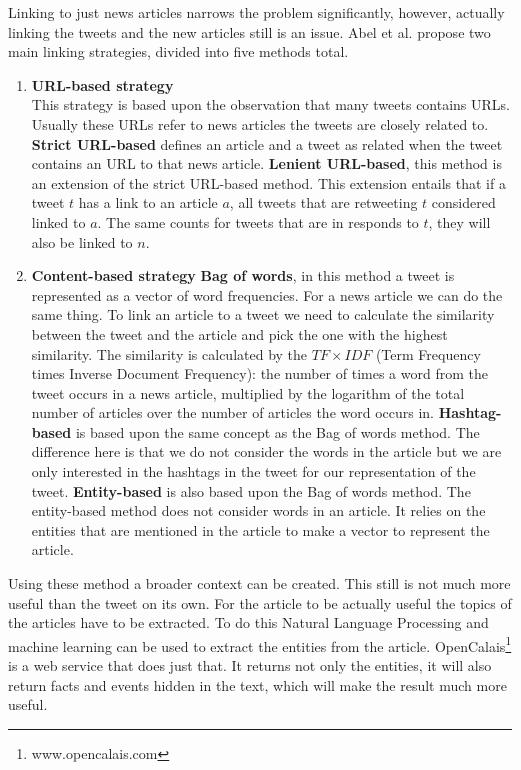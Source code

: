 \documentclass{article}
\begin{document}
Linking to just news articles narrows the problem significantly, however, actually linking the tweets and the new articles still is an issue. Abel et al. propose two main linking strategies, divided into five methods total.
\begin{enumerate}
\item \textbf{URL-based strategy}\\
This strategy is based upon the observation that many tweets contains URLs. Usually these URLs refer to news articles the tweets are closely related to.
	\subitem \textbf{Strict URL-based} defines an article and a tweet as related when the tweet contains an URL to that news article.
	\subitem \textbf{Lenient URL-based}, this method is an extension of the strict URL-based method. This extension entails that if a tweet $t$ has a link to an article $a$, all tweets that are retweeting $t$ considered linked to $a$. The same counts for tweets that are in responds to $t$, they will also be linked to $n$.
\item \textbf{Content-based strategy}
	\subitem \textbf{Bag of words}, in this method a tweet is represented as a vector of word frequencies. For a news article we can do the same thing. To link an article to a tweet we need to calculate the similarity between the tweet and the article and pick the one with the highest similarity. The similarity is calculated by the $TF \times IDF$ (Term Frequency times Inverse Document Frequency): the number of times a word from the tweet occurs in a news article, multiplied by the logarithm of the total number of articles over the number of articles the word occurs in. 
	\subitem \textbf{Hashtag-based} is based upon the same concept as the Bag of words method. The difference here is that we do not consider the words in the article but we are only interested in the hashtags in the tweet for our representation of the tweet.
	\subitem \textbf{Entity-based} is also based upon the Bag of words method. The entity-based method does not consider words in an article. It relies on the entities that are mentioned in the article to make a vector to represent the article. 
\end{enumerate}
Using these method a broader context can be created. This still is not much more useful than the tweet on its own. For the article to be actually useful the topics of the articles have to be extracted. To do this Natural Language Processing and machine learning can be used to extract the entities from the article. OpenCalais\footnote{www.opencalais.com} is a web service that does just that. It returns not only the entities, it will also return facts and events hidden in the text, which will make the result much more useful.
\newpage
\end{document}
